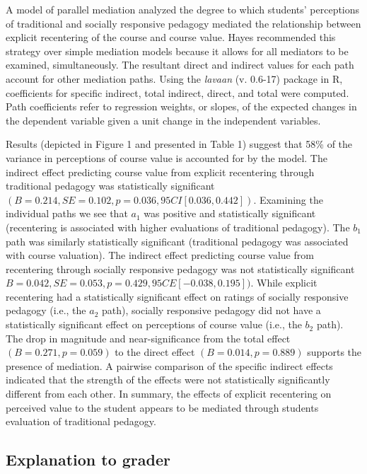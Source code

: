 \documentclass[
  11pt,
]{book}
\begin{document}
A model of parallel mediation analyzed the degree to which students' perceptions of traditional and socially responsive pedagogy mediated the relationship between explicit recentering of the course and course value. Hayes \citeyearpar{hayes_more_2022} recommended this strategy over simple mediation models because it allows for all mediators to be examined, simultaneously. The resultant direct and indirect values for each path account for other mediation paths. Using the \emph{lavaan} (v. 0.6-17) package in R, coefficients for specific indirect, total indirect, direct, and total were computed. Path coefficients refer to regression weights, or slopes, of the expected changes in the dependent variable given a unit change in the independent variables.

Results (depicted in Figure 1 and presented in Table 1) suggest that 58\% of the variance in perceptions of course value is accounted for by the model. The indirect effect predicting course value from explicit recentering through traditional pedagogy was statistically significant \((B = 0.214, SE = 0.102, p = 0.036, 95CI [0.036, 0.442])\). Examining the individual paths we see that \(a_{1}\) was positive and statistically significant (recentering is associated with higher evaluations of traditional pedagogy). The \(b_{1}\) path was similarly statistically significant (traditional pedagogy was associated with course valuation). The indirect effect predicting course value from recentering through socially responsive pedagogy was not statistically significant \(B = 0.042, SE = 0.053, p = 0.429, 95CE [-0.038, 0.195])\). While explicit recentering had a statistically significant effect on ratings of socially responsive pedagogy (i.e., the \(a_{2}\) path), socially responsive pedagogy did not have a statistically significant effect on perceptions of course value (i.e., the \(b_{2}\) path). The drop in magnitude and near-significance from the total effect \((B = 0.271, p = 0.059)\) to the direct effect \((B = 0.014, p = 0.889)\) supports the presence of mediation. A pairwise comparison of the specific indirect effects indicated that the strength of the effects were not statistically significantly different from each other. In summary, the effects of explicit recentering on perceived value to the student appears to be mediated through students evaluation of traditional pedagogy.

\hypertarget{explanation-to-grader-1}{%
\subsection*{Explanation to grader}\label{explanation-to-grader-1}}
\end{document}
